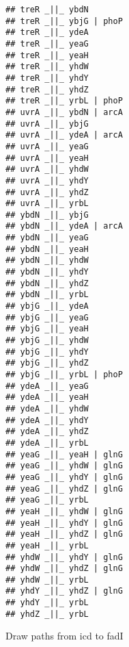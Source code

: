 \documentclass[
]{article}
\newenvironment{Shaded}{\begin{snugshade}}{\end{snugshade}}
\newcommand{\FunctionTok}[1]{\textcolor[rgb]{0.00,0.00,0.00}{#1}}
\newcommand{\NormalTok}[1]{#1}
\newcommand{\SpecialCharTok}[1]{\textcolor[rgb]{0.00,0.00,0.00}{#1}}
\newcommand{\StringTok}[1]{\textcolor[rgb]{0.31,0.60,0.02}{#1}}
\begin{document}
\begin{verbatim}
## treR _||_ ybdN
## treR _||_ ybjG | phoP
## treR _||_ ydeA
## treR _||_ yeaG
## treR _||_ yeaH
## treR _||_ yhdW
## treR _||_ yhdY
## treR _||_ yhdZ
## treR _||_ yrbL | phoP
## uvrA _||_ ybdN | arcA
## uvrA _||_ ybjG
## uvrA _||_ ydeA | arcA
## uvrA _||_ yeaG
## uvrA _||_ yeaH
## uvrA _||_ yhdW
## uvrA _||_ yhdY
## uvrA _||_ yhdZ
## uvrA _||_ yrbL
## ybdN _||_ ybjG
## ybdN _||_ ydeA | arcA
## ybdN _||_ yeaG
## ybdN _||_ yeaH
## ybdN _||_ yhdW
## ybdN _||_ yhdY
## ybdN _||_ yhdZ
## ybdN _||_ yrbL
## ybjG _||_ ydeA
## ybjG _||_ yeaG
## ybjG _||_ yeaH
## ybjG _||_ yhdW
## ybjG _||_ yhdY
## ybjG _||_ yhdZ
## ybjG _||_ yrbL | phoP
## ydeA _||_ yeaG
## ydeA _||_ yeaH
## ydeA _||_ yhdW
## ydeA _||_ yhdY
## ydeA _||_ yhdZ
## ydeA _||_ yrbL
## yeaG _||_ yeaH | glnG
## yeaG _||_ yhdW | glnG
## yeaG _||_ yhdY | glnG
## yeaG _||_ yhdZ | glnG
## yeaG _||_ yrbL
## yeaH _||_ yhdW | glnG
## yeaH _||_ yhdY | glnG
## yeaH _||_ yhdZ | glnG
## yeaH _||_ yrbL
## yhdW _||_ yhdY | glnG
## yhdW _||_ yhdZ | glnG
## yhdW _||_ yrbL
## yhdY _||_ yhdZ | glnG
## yhdY _||_ yrbL
## yhdZ _||_ yrbL
\end{verbatim}

Draw paths from icd to fadI

\begin{Shaded}
\end{Shaded}
\end{document}
